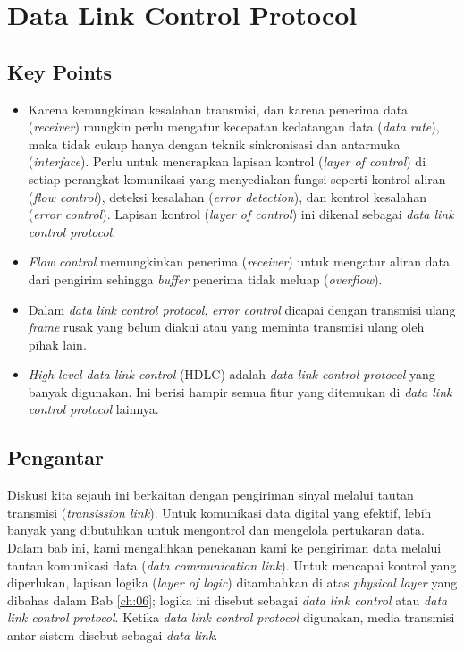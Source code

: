 \chapter{Data Link Control Protocol}

\section{Key Points}
\begin{itemize}
	\item Karena kemungkinan kesalahan transmisi, dan karena penerima data (\textit{receiver}) mungkin perlu mengatur kecepatan kedatangan data (\textit{data rate}), maka tidak cukup hanya dengan teknik sinkronisasi dan antarmuka (\textit{interface}). Perlu untuk menerapkan lapisan kontrol (\textit{layer of control}) di setiap perangkat komunikasi yang menyediakan fungsi seperti kontrol aliran (\textit{flow control}), deteksi kesalahan (\textit{error detection}), dan kontrol kesalahan (\textit{error control}). Lapisan kontrol (\textit{layer of control}) ini dikenal sebagai \textit{data link control protocol}.

	\item \textit{Flow control} memungkinkan penerima (\textit{receiver}) untuk mengatur aliran data dari pengirim sehingga \textit{buffer} penerima tidak meluap (\textit{overflow}).
	
	\item Dalam \textit{data link control protocol}, \textit{error control} dicapai dengan transmisi ulang \textit{frame} rusak yang belum diakui atau yang meminta transmisi ulang oleh pihak lain.
	
	\item \textit{High-level data link control} (HDLC) adalah \textit{data link control protocol} yang banyak digunakan. Ini berisi hampir semua fitur yang ditemukan di \textit{data link control protocol} lainnya.
\end{itemize}


\section{Pengantar}

Diskusi kita sejauh ini berkaitan dengan pengiriman sinyal melalui tautan transmisi (\textit{transission link}). Untuk komunikasi data digital yang efektif, lebih banyak yang dibutuhkan untuk mengontrol dan mengelola pertukaran data. Dalam bab ini, kami mengalihkan penekanan kami ke pengiriman data melalui tautan komunikasi data (\textit{data communication link}). Untuk mencapai kontrol yang diperlukan, lapisan logika (\textit{layer of logic}) ditambahkan di atas \textit{physical layer} yang dibahas dalam Bab \ref{ch:06}; logika ini disebut sebagai \textit{data link control} atau \textit{data link control protocol}. Ketika \textit{data link control protocol} digunakan, media transmisi antar sistem disebut sebagai \textit{data link}.

